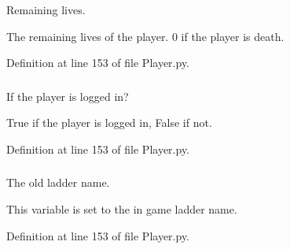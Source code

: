 \-Remaining lives. 

\-The remaining lives of the player. 0 if the player is death. 

\-Definition at line 153 of file \-Player.\-py.

\hypertarget{class_player_1_1_player_a4144fc592e3ff9122bd4cbc230fac652}{
\subsubsection[{\-\_\-\-\_\-logged\-\_\-in}]{}}
\label{class_player_1_1_player_a4144fc592e3ff9122bd4cbc230fac652}


\-If the player is logged in? 

\-True if the player is logged in, \-False if not. 

\-Definition at line 153 of file \-Player.\-py.

\hypertarget{class_player_1_1_player_acbd98997cb172fdf4ea5a44428231462}{
\subsubsection[{\-\_\-\-\_\-old\-\_\-ladder\-\_\-name}]{}}
\label{class_player_1_1_player_acbd98997cb172fdf4ea5a44428231462}


\-The old ladder name. 

\-This variable is set to the in game ladder name. 

\-Definition at line 153 of file \-Player.\-py.

\hypertarget{class_player_1_1_player_a2d57645ad97f96d154bf84ae7237767d}{
\subsubsection[{\-\_\-\-\_\-old\-\_\-name}]{}}
\label{class_player_1_1_player_a2d57645ad97f96d154bf84ae7237767d}


